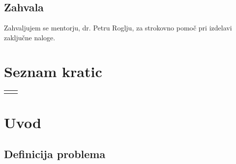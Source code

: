 \documentclass[12pt,a4paper,titlepage,openany]{report}
\begin{document}

\newpage
\section*{Zahvala}

Zahvaljujem se mentorju, dr. Petru Roglju, za strokovno pomoč pri izdelavi zaključne naloge.

\newpage

\tableofcontents
{}
\newpage
\listoftables
{}
\newpage
\listoffigures
{}
\newpage
\renewcommand{\cftdot}{}
\listofappendices
\thispagestyle{fancy}
\newpage

\chapter*{Seznam kratic}
\thispagestyle{fancyplain}
\begin{longtable}{@{}p{1cm}@{}p{\dimexpr\textwidth-1cm\relax}@{}}
\nomenclature{$tj.$}{to je}
\nomenclature{$npr.$}{na primer}
\end{longtable}
\newpage

\normalsize


% 
% 

\chapter{Uvod}
\thispagestyle{fancy}

\section{Definicija problema}
\thispagestyle{fancy}
\end{document}
